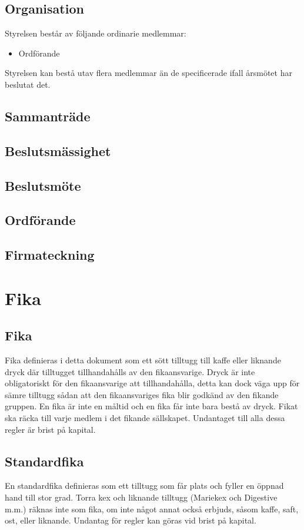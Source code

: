 \documentclass{article}
\begin{document}
\subsection{Organisation}
Styrelsen består av följande ordinarie medlemmar:
\begin{itemize}
  \item Ordförande
\end{itemize}
Styrelsen kan bestå utav flera medlemmar än de specificerade ifall årsmötet har
beslutat det.

\subsection{Sammanträde}

\subsection{Beslutsmässighet}

\subsection{Beslutsmöte}

\subsection{Ordförande}

\subsection{Firmateckning}

\section{Fika}
\subsection{Fika}
Fika definieras i detta dokument som ett sött tilltugg till kaffe eller liknande
dryck där tilltugget tillhandahålls av den fikaansvarige. Dryck är inte
obligatoriskt för den fikaansvarige att tillhandahålla, detta kan dock väga upp
för sämre tilltugg sådan att den fikaansvariges fika blir godkänd av den fikande
gruppen. En fika är inte en måltid och en fika får inte bara bestå av dryck.
Fikat ska räcka till varje medlem i det fikande sällskapet. Undantaget till alla
dessa regler är brist på kapital.

\subsection{Standardfika}
En standardfika definieras som ett tilltugg som får plats och fyller en öppnad
hand till stor grad. Torra kex och liknande tilltugg (Mariekex och Digestive
m.m.) räknas inte som fika, om inte något annat också erbjuds, såsom kaffe,
saft, ost, eller liknande. Undantag för regler kan göras vid brist på kapital.
\end{document}
